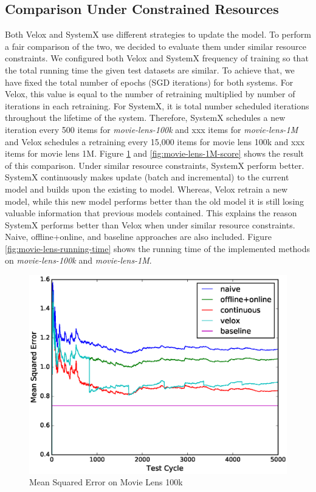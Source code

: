 \documentclass{sig-alternate-05-2015}
\begin{document}
\subsection{Comparison Under Constrained Resources }
Both Velox and SystemX use different strategies to update the model.
To perform a fair comparison of the two, we decided to evaluate them under similar resource constraints.
We configured both Velox and SystemX frequency of training so that the total running time the given test datasets are similar.
To achieve that, we have fixed the total number of epochs (SGD iterations) for both systems.
For Velox, this value is equal to the number of retraining multiplied by number of iterations in each retraining. 
For SystemX, it is total number scheduled iterations throughout the lifetime of the system.
Therefore, SystemX schedules a new iteration every 500 items for \textit{movie-lens-100k} and xxx items for \textit{movie-lens-1M} and Velox schedules a retraining every 15,000 items for movie lens 100k and xxx items for movie lens 1M.
Figure \ref{fig:movie-lens-100k-score} and \ref{fig:movie-lens-1M-score} shows the result of this comparison.
Under similar resource constraints, SystemX perform better.
SystemX continuously makes update (batch and incremental) to the current model and builds upon the existing to model.
Whereas, Velox retrain a new model, while this new model performs better than the old model it is still losing valuable information that previous models contained.
This explains the reason SystemX performs better than Velox when under similar resource constraints.
Naive, offline+online, and baseline approaches are also included.
Figure \ref{fig:movie-lens-running-time} shows the running time of the implemented methods on \textit{movie-lens-100k} and \textit{movie-lens-1M}.


\begin{figure}[!ht]
\centering
\includegraphics[width=\columnwidth]{../images/experiment-results/movie-lens-100k-quality.eps}
\caption{Mean Squared Error on Movie Lens 100k}
\label{fig:movie-lens-100k-score}
\end{figure}
\end{document}
